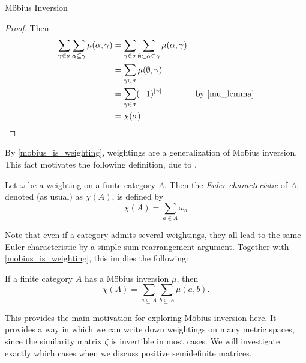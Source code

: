 \documentclass[12pt]{pom_thesis}
\begin{document}
\begin{chapter}{M\"obius Inversion}
\begin{thm}
\end{thm}
\begin{proof}
Then:
\begin{align*}
\sum_{\gamma \in \sigma} \sum_{\alpha \subseteq \gamma} \mu(\alpha, \gamma) &= \sum_{\gamma \in \sigma} \sum_{\emptyset \subset \alpha \subseteq \gamma} \mu(\alpha, \gamma)\\
&= \sum_{\gamma \in \sigma} \mu(\emptyset, \gamma)\\
&= \sum_{\gamma \in \sigma} (-1)^{|\gamma|} &\text{by \ref{mu_lemma}}\\
&= \chi(\sigma)
\end{align*}
\end{proof}
By \ref{mobius_is_weighting}, weightings are a generalization of Mo\"bius inversion. This fact motivates the following definition, due to \cite{Lein1}.
\begin{defn}
Let $\omega$ be a weighting on a finite category $A$. Then the \emph{Euler characteristic} of $A$, denoted (as usual) as $\chi(A)$, is defined by
\[
\chi(A) = \sum_{a \in A} \omega_a
\]
\end{defn}
Note that even if a category admits several weightings, they all lead to the same Euler characteristic by a simple sum rearrangement argument. Together with \ref{mobius_is_weighting}, this implies the following:
\begin{cor}
If a finite category $A$ has a M\"obius inversion $\mu$, then
\[\chi(A) = \sum_{a \subseteq A} \sum_{b \subseteq A} \mu(a, b).
\]
\end{cor}
This provides the main motivation for exploring M\"obius inversion here. It provides a way in which we can write down weightings on many metric spaces, since the similarity matrix $\zeta$ is invertible in most cases. We will investigate exactly which cases when we discuss positive semidefinite matrices.
\end{chapter}


\end{document}
